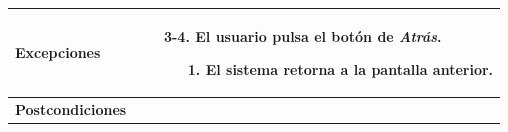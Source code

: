 \begin{longtable}{| p{4cm} | p{10cm} |}
\hline
\textbf{Excepciones} &\mbox{}\par\vspace{-\baselineskip}
\begin{enumerate}[leftmargin=0.9cm, topsep=0.1cm]
\item[3-4.] El usuario pulsa el botón de \textit{Atrás}.
	\begin{itemize}
	\item[1.] El sistema retorna a la pantalla anterior.
	\end{itemize}
\end{enumerate}
\\

\hline
\textbf{Postcondiciones} & \\
\hline
\end{longtable}



\newpage
